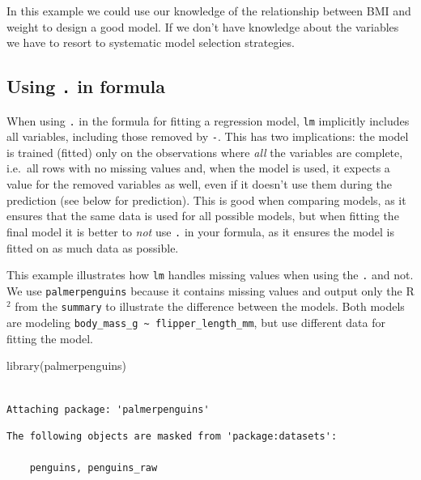 \documentclass[
  letterpaper,
  DIV=11,
  numbers=noendperiod]{scrreprt}
\newenvironment{Shaded}{\begin{snugshade}}{\end{snugshade}}
\newcommand{\FunctionTok}[1]{\textcolor[rgb]{0.28,0.35,0.67}{#1}}
\newcommand{\NormalTok}[1]{\textcolor[rgb]{0.00,0.23,0.31}{#1}}
\begin{document}
In this example we could use our knowledge of the relationship between
BMI and weight to design a good model. If we don't have knowledge about
the variables we have to resort to systematic model selection
strategies.

\subsection{\texorpdfstring{Using \texttt{.} in
formula}{Using . in formula}}\label{sec-multlinreg-usingdot}

When using \texttt{.} in the formula for fitting a regression model,
\texttt{lm} implicitly includes all variables, including those removed
by \texttt{-}. This has two implications: the model is trained (fitted)
only on the observations where \emph{all} the variables are complete,
i.e.~all rows with no missing values and, when the model is used, it
expects a value for the removed variables as well, even if it doesn't
use them during the prediction (see below for prediction). This is good
when comparing models, as it ensures that the same data is used for all
possible models, but when fitting the final model it is better to
\emph{not} use \texttt{.} in your formula, as it ensures the model is
fitted on as much data as possible.

This example illustrates how \texttt{lm} handles missing values when
using the \texttt{.} and not. We use \texttt{palmerpenguins} because it
contains missing values and output only the R\(^2\) from the
\texttt{summary} to illustrate the difference between the models. Both
models are modeling
\texttt{body\_mass\_g\ \textasciitilde{}\ flipper\_length\_mm}, but use
different data for fitting the model.

\begin{Shaded}
\begin{Highlighting}[]
\FunctionTok{library}\NormalTok{(palmerpenguins)}
\end{Highlighting}
\end{Shaded}

\begin{verbatim}

Attaching package: 'palmerpenguins'
\end{verbatim}

\begin{verbatim}
The following objects are masked from 'package:datasets':

    penguins, penguins_raw
\end{verbatim}
\end{document}
